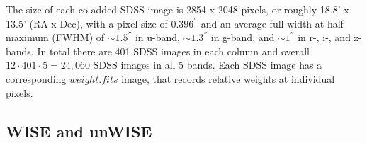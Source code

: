 \documentclass[apj,iop]{emulateapj}
\begin{document}

The size of each co-added SDSS image is 2854 x 2048 pixels, or roughly 18.8' x 13.5' (RA x Dec), with a pixel size of $0.396^{''}$ and an average full width at half maximum (FWHM) of $\sim1.5^{''}$ in u-band, $\sim1.3^{''}$ in g-band, and $\sim1^{''}$ in r-, i-, and z-bands. In total there are 401 SDSS images in each column and overall $12 \cdot 401 \cdot 5 = 24,060$ SDSS images in all 5 bands. Each SDSS image has a corresponding $weight.fits$ image, that records relative weights at individual pixels.

\subsection{WISE and unWISE}



\end{document}
